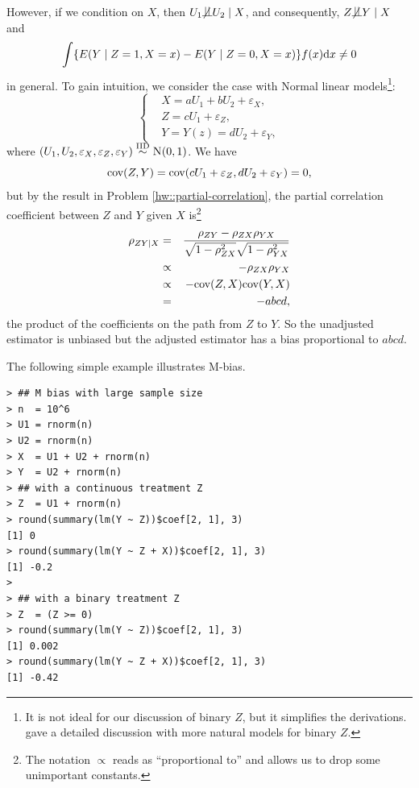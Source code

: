 However, if we condition on $X$, then $U_1\nind  U_2 \mid X$, and consequently, $Z\nind Y\mid X$ and
$$
\int \{  E(Y\mid Z=1, X=x) - E(Y\mid Z=0, X=x) \} f(x) \textup{d} x \neq 0
$$
in general. 
To gain intuition, we consider the case with Normal linear models\footnote{It is not ideal for our discussion of binary $Z$, but it simplifies the derivations. \citet{ding2015adjust} gave a detailed discussion with more natural models for binary $Z$. }:
$$
\left\{ 
\begin{aligned}
&X = a U_1 + b U_2 +  \varepsilon_X,\\
&Z=   cU_1 +  \varepsilon_Z , \\
&Y=      Y(z) =  dU_2 +  \varepsilon_Y ,
\end{aligned}
\right. 
$$
where $(U_1, U_2, \varepsilon_X, \varepsilon_Z, \varepsilon_Y)  \iidsim \N01$. 
We have 
$$
\textup{cov}(Z,Y) = \textup{cov}(  cU_1 +  \varepsilon_Z,  dU_2 +  \varepsilon_Y) = 0,
$$
but by the result in Problem \ref{hw::partial-correlation}, the partial correlation coefficient between $Z$ and $Y$ given $X$ is\footnote{The notation $\propto$ reads as ``proportional to'' and allows us to drop some unimportant constants.}
\begin{eqnarray*}
\rho_{ZY\mid X} &=& \frac{   \rho_{ZY} - \rho_{ZX} \rho_{YX}  }{  \sqrt{  1-\rho_{ZX}^2 }  \sqrt{1- \rho_{YX}^2  }  }   
\\
&\propto &  - \rho_{ZX} \rho_{YX}  \\
&\propto &  - \textup{cov}(Z, X) \textup{cov}(Y, X)  \\
&=&  - abcd,
\end{eqnarray*}
the product of the coefficients on the path from $Z$ to $Y$. 
So the unadjusted estimator is unbiased but the adjusted estimator has a bias proportional to $abcd$. 


 
 
The following simple example illustrates M-bias.

\begin{lstlisting}
> ## M bias with large sample size
> n  = 10^6
> U1 = rnorm(n)
> U2 = rnorm(n)
> X  = U1 + U2 + rnorm(n)
> Y  = U2 + rnorm(n)
> ## with a continuous treatment Z
> Z  = U1 + rnorm(n)
> round(summary(lm(Y ~ Z))$coef[2, 1], 3)
[1] 0
> round(summary(lm(Y ~ Z + X))$coef[2, 1], 3)
[1] -0.2
> 
> ## with a binary treatment Z
> Z  = (Z >= 0)
> round(summary(lm(Y ~ Z))$coef[2, 1], 3)
[1] 0.002
> round(summary(lm(Y ~ Z + X))$coef[2, 1], 3)
[1] -0.42
\end{lstlisting}



